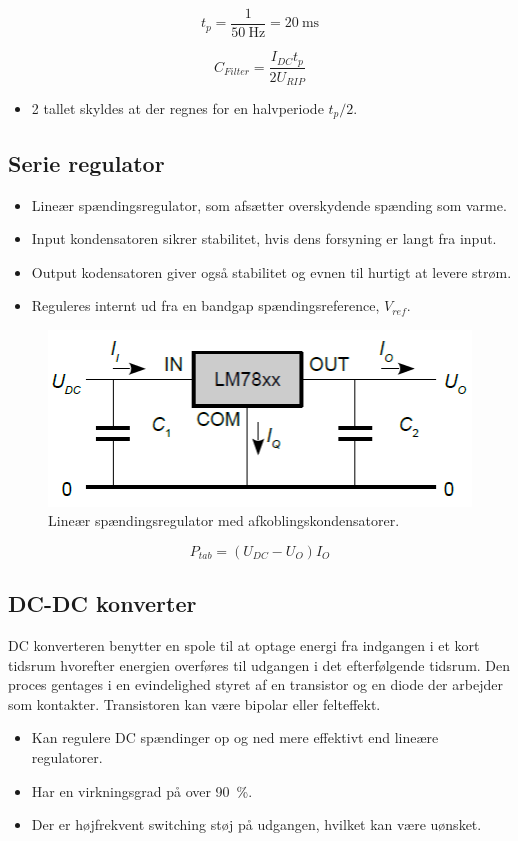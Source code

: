 \documentclass[danish]{article}
\begin{document}
\begin{equation}
t_p = \dfrac{1}{\SI{50}{\hertz}} = \SI{20}{\milli\second}
\end{equation}

\begin{equation}
C_{Filter} = \dfrac{I_{DC}t_p}{2 U_{RIP}}
\end{equation}

\begin{itemize}
	\item 2 tallet skyldes at der regnes for en halvperiode $t_p/2$.
\end{itemize}

\newpage
\subsection{Serie regulator}
\begin{itemize}
	\item Lineær spændingsregulator, som afsætter overskydende spænding som varme.
	\item Input kondensatoren sikrer stabilitet, hvis dens forsyning er langt fra input.
	\item Output kodensatoren giver også stabilitet og evnen til hurtigt at levere strøm.
	\item Reguleres internt ud fra en bandgap spændingsreference, $V_{ref}$.
\end{itemize}

\begin{figure} [H]
	\centering
	\includegraphics[width=0.6\linewidth]{graphics/serieregulator}
	\caption{Lineær spændingsregulator med afkoblingskondensatorer.}
	\label{fig:serieregulator}
\end{figure}

\begin{equation}
P_{tab} = (U_{DC} - U_O) I_O
\end{equation}

\subsection{DC-DC konverter}
DC konverteren benytter en spole til at optage energi fra indgangen i et kort tidsrum hvorefter energien overføres til udgangen i det efterfølgende tidsrum. 
Den proces gentages i en evindelighed styret af en transistor og en diode der arbejder som kontakter. 
Transistoren kan være bipolar eller felteffekt.
\begin{itemize}
	\item Kan regulere DC spændinger op og ned mere effektivt end lineære regulatorer.
	\item Har en virkningsgrad på over \SI{90}{\percent}.
	\item Der er højfrekvent switching støj på udgangen, hvilket kan være uønsket.
\end{itemize}
\end{document}
